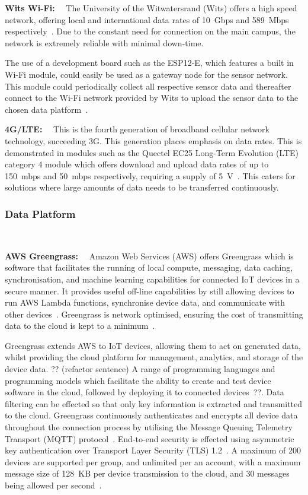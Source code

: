 \documentclass[10pt,twocolumn]{witseiepaper}
\begin{document}
				\textbf{Wits Wi-Fi:}~~
				The University of the Witwatersrand (Wits) offers a high speed network, offering local and international data rates of 10~Gbps and 589~Mbps respectively~\cite{wits-speed}. Due to the constant need for connection on the main campus, the network is extremely reliable with minimal down-time.
				
				The use of a development board such as the ESP12-E, which features a built in Wi-Fi module, could easily be used as a gateway node for the sensor network. This module could periodically collect all respective sensor data and thereafter connect to the Wi-Fi network provided by Wits to upload the sensor data to the chosen data platform~\cite{esp12e}.
			
				\textbf{4G/LTE:}~~
				This is the fourth generation of broadband cellular network technology, succeeding 3G. This generation places emphasis on data rates. This is demonstrated in modules such as the Quectel EC25 Long-Term Evolution (LTE) category 4 module which offers download and upload data rates of up to 150~mbps and 50~mbps respectively, requiring a supply of 5~V~\cite{ec25}. This caters for solutions where large amounts of data needs to be transferred continuously.

		\subsubsection{Data Platform} $   $
		
				\textbf{AWS Greengrass:}~~
				Amazon Web Services (AWS) offers Greengrass which is software that facilitates the running of local compute, messaging, data caching, synchronisation, and machine learning capabilities for connected IoT devices in a secure manner. It provides useful off-line capabilities by still allowing devices to run AWS Lambda functions, synchronise device data, and communicate with other devices~\cite{greengrass}. Greengrass is network optimised, ensuring the cost of transmitting data to the cloud is kept to a minimum~\cite{greengrass}.
				
				Greengrass extends AWS to IoT devices, allowing them to act on generated data, whilst providing the cloud platform for management, analytics, and storage of the device data. ?? (refactor sentence) A range of programming languages and programming models which facilitate the ability to create and test device software in the cloud, followed by deploying it to connected devices~\cite{greengrass}??. 
				Data filtering can be effected so that only key information is extracted and transmitted to the cloud. Greengrass continuously authenticates and encrypts all device data throughout the connection process by utilising the Message Queuing Telemetry Transport (MQTT) protocol~\cite{greengrass}. End-to-end security is effected using asymmetric key authentication over Transport Layer Security (TLS) 1.2~\cite{greengrass}. A maximum of 200 devices are supported per group, and unlimited per an account, with a maximum message size of 128~KB per device transmission to the cloud, and 30 messages being allowed per second~\cite{aws-quota}.
				
\end{document}

